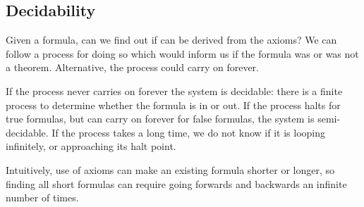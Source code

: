 \subsection{Decidability}

Given a formula, can we find out if can be derived from the axioms? We can follow a process for doing so which would inform us if the formula was or was not a theorem. Alternative, the process could carry on forever.

If the process never carries on forever the system is decidable: there is a finite process to determine whether the formula is in or out. If the process halts for true formulas, but can carry on forever for false formulas, the system is semi-decidable. If the process takes a long time, we do not know if it is looping infinitely, or approaching its halt point.

Intuitively, use of axioms can make an existing formula shorter or longer, so finding all short formulas can require going forwards and backwards an infinite number of times.

